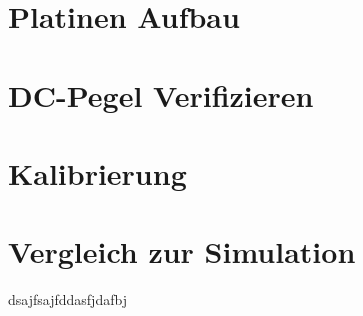 
\section{Platinen Aufbau}
\section{DC-Pegel Verifizieren}
\section{Kalibrierung}
\section{Vergleich zur Simulation}
\clearpage
dsajfsajfddasfjdafbj